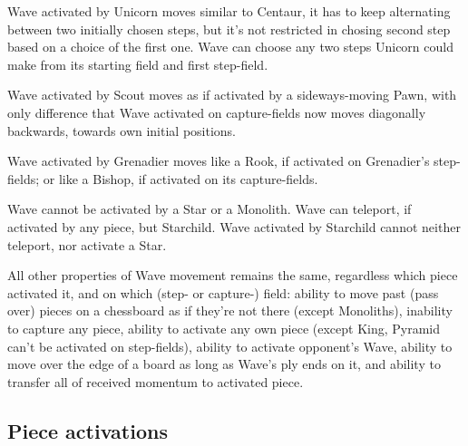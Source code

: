 Wave activated by Unicorn moves similar to Centaur, it has to keep alternating
between two initially chosen steps, but it's not restricted in chosing second step
based on a choice of the first one. Wave can choose any two steps Unicorn could
make from its starting field and first step-field.

Wave activated by Scout moves as if activated by a sideways-moving Pawn, with only
difference that Wave activated on capture-fields now moves diagonally backwards,
towards own initial positions.

Wave activated by Grenadier moves like a Rook, if activated on Grenadier's step-fields;
or like a Bishop, if activated on its capture-fields.

Wave cannot be activated by a Star or a Monolith. Wave can teleport, if activated
by any piece, but Starchild. Wave activated by Starchild cannot neither teleport,
nor activate a Star.

All other properties of Wave movement remains the same, regardless which piece
activated it, and on which (step- or capture-) field: ability to move past (pass
over) pieces on a chessboard as if they're not there (except Monoliths), inability
to capture any piece, ability to activate any own piece (except King, Pyramid can't
be activated on step-fields), ability to activate opponent's Wave, ability to move
over the edge of a board as long as Wave's ply ends on it, and ability to transfer
all of received momentum to activated piece.

\clearpage %

\subsection*{Piece activations}
\label{sec:Appendix/Summary/Piece activations}

